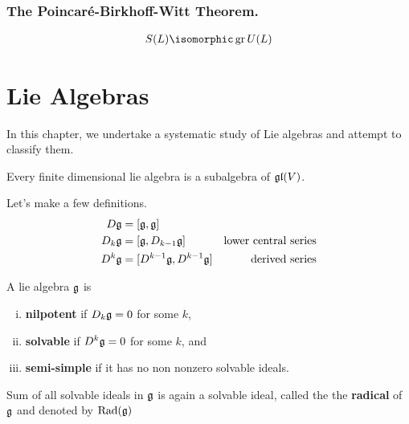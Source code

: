 \subsection{The Poincar\'e-Birkhoff-Witt Theorem.}
\label{sub:the_poincar'e_birkhoff_witt_theorem_}


\begin{theorem}
    \begin{align}
        S(L) \isomorphic \gr U(L)
    \end{align}
\end{theorem}




\chapter{Lie Algebras}
\label{cha:lie_algebras}
In this chapter, we undertake a systematic study of Lie algebras and attempt to classify them.


\begin{theorem}
Every finite dimensional lie algebra is a subalgebra of $\mathfrak{gl}(V)$.
\end{theorem}

Let's make a few definitions.
\begin{align}
    D\mathfrak{g} &= [\mathfrak{g}, \mathfrak{g}] &\text{}\\
    D_k\mathfrak{g} &= [\mathfrak{g}, D_{k-1}\mathfrak{g}] &\text{lower central series}\\
    D^k\mathfrak{g} &= [D^{k-1}\mathfrak{g}, D^{k-1}\mathfrak{g}] &\text{derived series}
\end{align}

\begin{definition} A lie algebra $\mathfrak{g}$ is 
    \begin{enumerate}[(i)]
        \makethislistcompact
        \item \textbf{nilpotent} if $D_k\mathfrak{g}=0$ for some $k$,
        \item \textbf{solvable} if $D^k\mathfrak{g}=0$ for some $k$, and
        \item \textbf{semi-simple} if it has no non nonzero solvable ideals.
    \end{enumerate}
\end{definition}

\begin{definition}[Radical]
    Sum of all solvable ideals in $\mathfrak{g}$ is again a solvable ideal, called the the \textbf{radical} of $\mathfrak{g}$ and denoted by $\operatorname{Rad}(\mathfrak{g})$
\end{definition}

